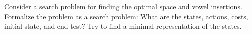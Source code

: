 \item {}

Consider a search problem for finding the optimal space and vowel insertions.
Formalize the problem as a search problem: What are the states, actions, costs,
initial state, and end test? Try to find a minimal representation of the states.
